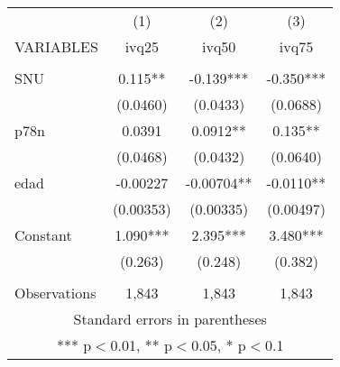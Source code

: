 \begin{tabular}{lccc} \hline
 & (1) & (2) & (3) \\
VARIABLES & ivq25 & ivq50 & ivq75 \\ \hline
 &  &  &  \\
SNU & 0.115** & -0.139*** & -0.350*** \\
 & (0.0460) & (0.0433) & (0.0688) \\
p78n & 0.0391 & 0.0912** & 0.135** \\
 & (0.0468) & (0.0432) & (0.0640) \\
edad & -0.00227 & -0.00704** & -0.0110** \\
 & (0.00353) & (0.00335) & (0.00497) \\
Constant & 1.090*** & 2.395*** & 3.480*** \\
 & (0.263) & (0.248) & (0.382) \\
 &  &  &  \\
 Observations & 1,843 & 1,843 & 1,843 \\ \hline
\multicolumn{4}{c}{ Standard errors in parentheses} \\
\multicolumn{4}{c}{ *** p$<$0.01, ** p$<$0.05, * p$<$0.1} \\
\end{tabular}
